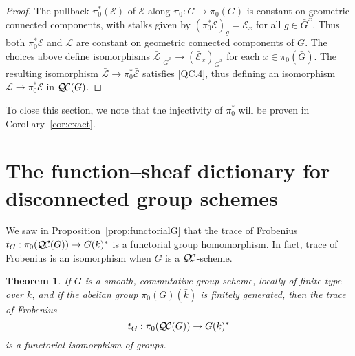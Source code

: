 \documentclass{amsart}
\theoremstyle{plain}
\newtheorem{theorem}{Theorem}[section]
\theoremstyle{definition}
\theoremstyle{remark}
\newcommand{\bFq}{\bar{k}}
\newcommand{\Fq}{k}
\newcommand{\qcs}[1]{{\mathcal{#1}}}
\newcommand{\gqcs}[1]{{\mathcal{\bar #1}}}
\newcommand{\QC}{{\mathcal{Q\hskip-0.8pt C}}}
\newcommand{\QCiso}[1]{\pi_0 (\QC(#1))}
\newcommand{\trFrob}[1]{t_{#1}}
\newcommand{\bG}{\bar{G}}
\begin{document}
\begin{proof}
The pullback $\pi_0^*(\qcs{E})$ of $\qcs{E}$ along $\pi_0 : G \to \pi_0(G)$ is constant 
on geometric connected components, with stalks given by 
$(\pi_0^* \qcs{E})_g = \qcs{E}_{x}$ for all $g\in \bG^x$.  Thus both $\pi_0^*\qcs{E}$ and $\qcs{L}$
are constant on geometric connected components of $G$. 
The choices above define isomorphisms
$\gqcs{L}\vert_{\bG^x} \to  (\gqcs{E}_{x})_{\bG^x}$ for each $x\in \pi_0(\bG)$.
The resulting isomorphism $\gqcs{L} \to \pi_0^* \gqcs{E}$ satisfies \ref{QC.4}, 
thus defining an isomorphism $\qcs{L} \to \pi_0^* \qcs{E}$ in $\QC(G)$.
\end{proof}

To close this section, we note that the injectivity of $\pi_0^*$ will be proven in Corollary~\ref{cor:exact}.

\section{The function--sheaf dictionary for disconnected group schemes}
\label{sec:snake}

We saw in Proposition~\ref{prop:functorialG} that the trace of Frobenius
$\trFrob{G} : \QCiso{G} \to G(\Fq)^*$ is a functorial group homomorphism.
In fact, trace of Frobenius is an isomorphism when $G$ is a $\QC$-scheme.

\begin{theorem}\label{thm:snake}
  If $G$ is a smooth, commutative group scheme, locally of finite type over
  $\Fq$, and if the abelian group $\pi_0(G)(\bFq)$
  is finitely generated, then the trace of Frobenius
  \[
  \trFrob{G} : \QCiso{G} \to G(\Fq)^*
  \]
  is a functorial isomorphism of groups. 
\end{theorem}
\end{document}

